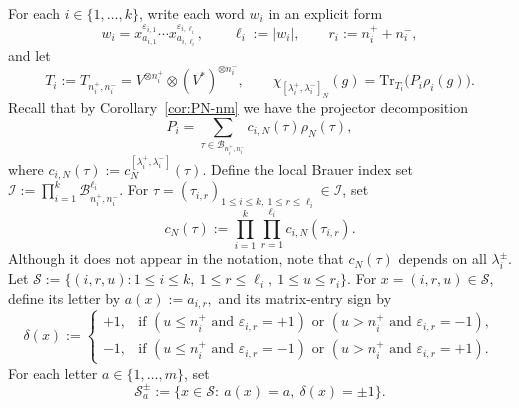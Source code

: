 \documentclass[11pt,a4paper,reqno]{article}
\theoremstyle{definition}
\theoremstyle{remark}
\newcommand\Tr{\mathrm{Tr}}
\newcommand\B{{\mathcal{B}}}
\begin{document}
For each $i\in\{1,\dots,k\}$, write each word $w_i$ in an explicit form
\[
w_i=x_{a_{i,1}}^{\varepsilon_{i,1}}\cdots x_{a_{i,\ell_i}}^{\varepsilon_{i,\ell_i}},\qquad \ell_i:=|w_i|, \qquad r_i:=n_i^+ + n_i^-,
\]
and let
\[
T_i:=T_{n_i^+,n_i^-}=V^{\otimes n_i^+}\otimes (V^*)^{\otimes n_i^-}, \qquad \chi_{[\lambda_i^+,\lambda_i^-]_N}(g)=\Tr_{T_i}\bigl(P_i\rho_i(g)\bigr).
\]
Recall that by Corollary~\ref{cor:PN-nm} we have the projector decomposition
\[
P_i=\sum_{\tau\in \B_{n_i^+,n_i^-}} c_{i,N}(\tau)\rho_N(\tau),
\]
where $c_{i,N}(\tau):=c_N^{[\lambda_i^+,\lambda_i^-]}(\tau)$. Define the local Brauer index set $\mathcal I :=\prod_{i=1}^k \B_{n_i^+,n_i^-}^{\ell_i}.$ For $\tau=(\tau_{i,r})_{1\le i\le k,\ 1\le r\le \ell_i}\in \mathcal I$, set
\[
c_N(\tau):=\prod_{i=1}^k\prod_{r=1}^{\ell_i} c_{i,N}(\tau_{i,r}).
\]
Although it does not appear in the notation, note that $c_N(\tau)$ depends on all $\lambda_i^\pm$. Let $\mathcal S:=\{(i,r,u): 1\le i\le k,\ 1\le r\le \ell_i,\ 1\le u\le r_i\}.$ For $x=(i,r,u)\in\mathcal S$, define its letter by $a(x):=a_{i,r},$ and its matrix-entry sign by
\[
\delta(x):=
\begin{cases}
+1,&\text{if }(u\le n_i^+\text{ and }\varepsilon_{i,r}=+1)\text{ or }(u>n_i^+\text{ and }\varepsilon_{i,r}=-1),\\
-1,&\text{if }(u\le n_i^+\text{ and }\varepsilon_{i,r}=-1)\text{ or }(u>n_i^+\text{ and }\varepsilon_{i,r}=+1).
\end{cases}
\]
For each letter $a\in\{1,\dots,m\}$, set
\[
\mathcal{S}_a^\pm:=\{x\in\mathcal S:\ a(x)=a,\ \delta(x)=\pm1\}.
\]
\end{document}
